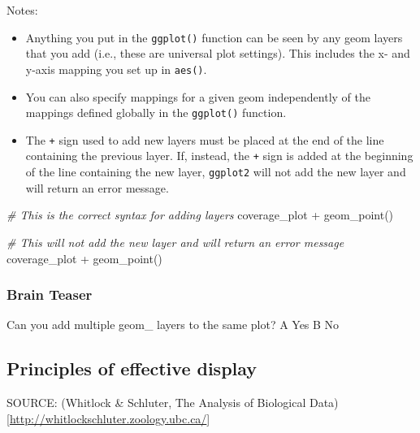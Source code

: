 \documentclass[
]{book}
\newenvironment{Shaded}{\begin{snugshade}}{\end{snugshade}}
\newcommand{\CommentTok}[1]{\textcolor[rgb]{0.56,0.35,0.01}{\textit{#1}}}
\newcommand{\FunctionTok}[1]{\textcolor[rgb]{0.00,0.00,0.00}{#1}}
\newcommand{\NormalTok}[1]{#1}
\newcommand{\SpecialCharTok}[1]{\textcolor[rgb]{0.00,0.00,0.00}{#1}}
\providecommand{\tightlist}{%
  \setlength{\itemsep}{0pt}\setlength{\parskip}{0pt}}
\begin{document}
Notes:

\begin{itemize}
\tightlist
\item
  Anything you put in the \texttt{ggplot()} function can be seen by any geom layers that you add (i.e., these are universal plot settings). This includes the x- and y-axis mapping you set up in \texttt{aes()}.
\item
  You can also specify mappings for a given geom independently of the mappings defined globally in the \texttt{ggplot()} function.
\item
  The \texttt{+} sign used to add new layers must be placed at the end of the line containing the previous layer. If, instead, the \texttt{+} sign is added at the beginning of the line containing the new layer, \texttt{ggplot2} will not add the new layer and will return an error message.
\end{itemize}

\begin{Shaded}
\begin{Highlighting}[]
\CommentTok{\# This is the correct syntax for adding layers}
\NormalTok{coverage\_plot }\SpecialCharTok{+}
  \FunctionTok{geom\_point}\NormalTok{()}

\CommentTok{\# This will not add the new layer and will return an error message}
\NormalTok{coverage\_plot}
  \SpecialCharTok{+} \FunctionTok{geom\_point}\NormalTok{()}
\end{Highlighting}
\end{Shaded}

\hypertarget{brain-teaser-2}{%
\subsubsection*{Brain Teaser}\label{brain-teaser-2}}

Can you add multiple geom\_ layers to the same plot?
A Yes
B No

\hypertarget{principles-of-effective-display}{%
\subsection*{Principles of effective display}\label{principles-of-effective-display}}

SOURCE: (Whitlock \& Schluter, The Analysis of Biological Data){[}\url{http://whitlockschluter.zoology.ubc.ca/}{]}
\end{document}
